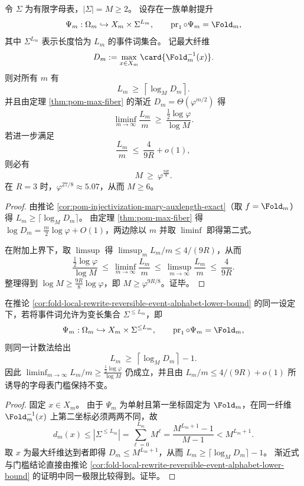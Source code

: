 \begin{corollary}[速度饱和与可逆事件字母表的下界]\label{cor:fold-local-rewrite-reversible-event-alphabet-lower-bound}
令 \(\Sigma\) 为有限字母表，\(|\Sigma|=M\ge 2\)。
设存在一族单射提升
\[
\Psi_m:\Omega_m\hookrightarrow X_m\times \Sigma^{L_m},
\qquad
\operatorname{pr}_1\circ\Psi_m=\Fold_m,
\]
其中 \(\Sigma^{L_m}\) 表示长度恰为 \(L_m\) 的事件词集合。
记最大纤维
\[
D_m:=\max_{x\in X_m}\card{\Fold_m^{-1}(x)}.
\]
则对所有 \(m\) 有
\[
L_m\ \ge\ \left\lceil \log_M D_m\right\rceil.
\]
并且由定理 \ref{thm:pom-max-fiber} 的渐近 \(D_m=\Theta(\varphi^{m/2})\) 得
\[
\liminf_{m\to\infty}\frac{L_m}{m}\ \ge\ \frac{\tfrac12\log\varphi}{\log M}.
\]
若进一步满足
\[
\frac{L_m}{m}\ \le\ \frac{4}{9R}+o(1),
\]
则必有
\[
M\ \ge\ \varphi^{\frac{9R}{8}}.
\]
在 \(R=3\) 时，\(\varphi^{27/8}\approx 5.07\)，从而 \(M\ge 6\)。
\end{corollary}
\begin{proof}
由推论 \ref{cor:pom-injectivization-mary-auxlength-exact}（取 \(f=\Fold_m\)）得
\(
L_m\ge \lceil \log_M D_m\rceil
\)。
由定理 \ref{thm:pom-max-fiber} 得 \(\log D_m=\frac{m}{2}\log\varphi+O(1)\)，两边除以 \(m\) 并取 \(\liminf\) 即得第二式。
\par
在附加上界下，取 \(\limsup\) 得 \(\limsup_m L_m/m\le 4/(9R)\)，从而
\[
\frac{\tfrac12\log\varphi}{\log M}\ \le\ \liminf_{m\to\infty}\frac{L_m}{m}
\ \le\ \limsup_{m\to\infty}\frac{L_m}{m}\ \le\ \frac{4}{9R}.
\]
整理得到 \(\log M\ge \frac{9R}{8}\log\varphi\)，即 \(M\ge \varphi^{9R/8}\)。证毕。
\end{proof}

\begin{remark}[变长事件词的计数版本]\label{rem:fold-local-rewrite-variable-length-event-words}
在推论 \ref{cor:fold-local-rewrite-reversible-event-alphabet-lower-bound} 的同一设定下，若将事件词允许为变长集合 \(\Sigma^{\le L_m}\)，即
\[
\Psi_m:\Omega_m\hookrightarrow X_m\times \Sigma^{\le L_m},
\qquad
\operatorname{pr}_1\circ\Psi_m=\Fold_m,
\]
则同一计数法给出
\[
L_m\ \ge\ \left\lceil \log_M D_m\right\rceil-1.
\]
因此
\(
\liminf_{m\to\infty}L_m/m\ge \frac{\tfrac12\log\varphi}{\log M}
\)
仍成立，并且由 \(L_m/m\le 4/(9R)+o(1)\) 所诱导的字母表门槛保持不变。
\end{remark}
\begin{proof}
固定 \(x\in X_m\)。
由于 \(\Psi_m\) 为单射且第一坐标固定为 \(\Fold_m\)，在同一纤维 \(\Fold_m^{-1}(x)\) 上第二坐标必须两两不同，故
\[
d_m(x)\le |\Sigma^{\le L_m}|=\sum_{\ell=0}^{L_m}M^\ell=\frac{M^{L_m+1}-1}{M-1}<M^{L_m+1}.
\]
取 \(x\) 为最大纤维达到者即得 \(D_m\le M^{L_m+1}\)，从而 \(L_m\ge \lceil\log_M D_m\rceil-1\)。
渐近式与门槛结论直接由推论 \ref{cor:fold-local-rewrite-reversible-event-alphabet-lower-bound} 的证明中同一极限比较得到。证毕。
\end{proof}

